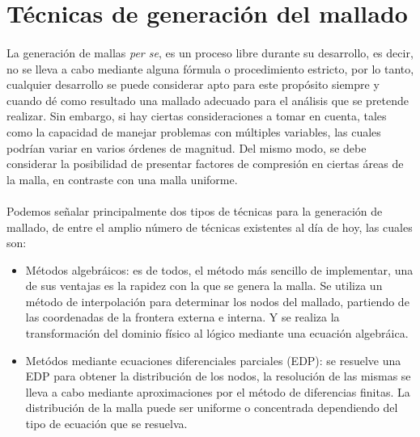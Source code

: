 \documentclass[letterpaper, openright, 12pt]{book}
\begin{document}
    \section{Técnicas de generación del mallado}
    \paragraph*{}
    La generación de mallas \textit{per se}, es un proceso libre durante su
    desarrollo, es decir, no se lleva a cabo mediante alguna fórmula o
    procedimiento estricto, por lo tanto, cualquier desarrollo se puede
    considerar apto para este propósito siempre y cuando dé como resultado
    una mallado adecuado para el análisis que se pretende realizar. Sin
    embargo, si hay ciertas consideraciones a tomar en cuenta, tales como la
    capacidad de manejar problemas con múltiples variables, las cuales
    podrían variar en varios órdenes de magnitud. Del mismo modo, se debe
    considerar la posibilidad de presentar factores de compresión en ciertas
    áreas de la malla, en contraste con una malla uniforme.

    \paragraph*{}
    Podemos señalar principalmente dos tipos de técnicas para la generación
    de mallado, de entre el amplio número de técnicas existentes al día de
    hoy, las cuales son:
    \begin{itemize}
        \item Métodos algebráicos: es de todos, el método más sencillo de
            implementar, una de sus ventajas es la rapidez con la que se
            genera la malla. Se utiliza un método de interpolación para
            determinar los nodos del mallado, partiendo de las coordenadas
            de la frontera externa e interna. Y se realiza la transformación
            del dominio físico al lógico mediante una ecuación algebráica.
        \item Metódos mediante  ecuaciones diferenciales parciales (EDP): se
            resuelve una EDP para obtener la distribución de los nodos,
            la resolución de las mismas se lleva a cabo mediante
            aproximaciones por el método de diferencias finitas. La
            distribución de la malla puede ser uniforme o concentrada
            dependiendo del tipo de ecuación que se resuelva.
    \end{itemize}
\end{document}
